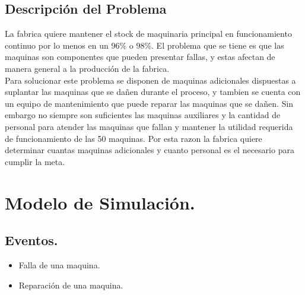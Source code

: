 \documentclass[10pt]{article}
\begin{document}
\subsection{Descripción del Problema}

La fabrica quiere mantener el stock de maquinaria principal en funcionamiento continuo por lo menos en un 96\% o 98\%. El problema que se tiene es que las maquinas son componentes que pueden presentar fallas, y estas afectan de manera general a la producción de la fabrica.\\

Para solucionar este problema se disponen de maquinas adicionales dispuestas a suplantar las maquinas que se dañen durante el proceso, y tambien se cuenta con un equipo de mantenimiento que puede reparar las maquinas que se dañen. Sin embargo no siempre son suficientes las maquinas auxiliares y la cantidad de personal para atender las maquinas que fallan y mantener la utilidad requerida de funcionamiento de las 50 maquinas. Por esta razon la fabrica quiere determinar cuantas maquinas adicionales y cuanto personal es el necesario para cumplir la meta.

\section{Modelo de Simulación.}

\subsection{Eventos.}

\begin{itemize}
\item Falla de una maquina.
\item Reparación de una maquina.
\end{itemize}
\end{document}
